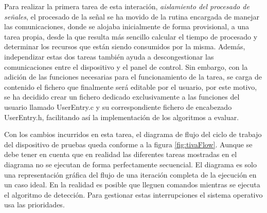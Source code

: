         Para realizar la primera tarea de esta interación, \textit{aislamiento del procesado de señales}, el procesado de la señal se ha movido de la rutina encargada de manejar las comunicaciones, donde se alojaba inicialmente de forma provisional, a una tarea propia, desde la que resulta más sencillo calcular el tiempo de procesado y determinar los recursos que están siendo consumidos por la misma. Además, independizar estas dos tareas también ayuda a descongestionar las comunicaciones entre el dispositivo y el panel de control. Sin embargo, con la adición de las funciones necesarias para el funcionamiento de la tarea, se carga de contenido el fichero que finalmente será editable por el usuario, por este motivo, se ha decidido crear un fichero dedicado exclusivamente a las funciones del usuario llamado UserEntry.c y su correspondiente fichero de encabezado UserEntry.h, facilitando así la implementación de los algoritmos a evaluar. 
        
        Con los cambios incurridos en esta tarea, el diagrama de flujo del ciclo de trabajo del dispositivo de pruebas queda conforme a la figura \ref{fig:tivaFlow}. Aunque se debe tener en cuenta que en realidad las diferentes tareas mostradas en el diagrama no se ejecutan de forma perfectamente secuencial. El diagrama es solo una representación gráfica del flujo de una iteración completa de la ejecución en un caso ideal. En la realidad es posible que lleguen comandos mientras se ejecuta el algoritmo de detección. Para gestionar estas interrupciones el sistema operativo usa las prioridades.
        
